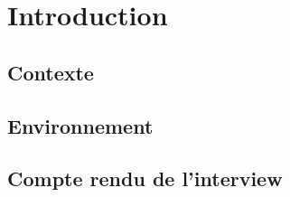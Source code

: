 \chapter*{Introduction}

\section*{Contexte}

\section*{Environnement}

\section*{Compte rendu de l'interview} 
 
